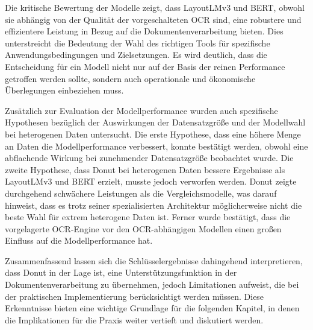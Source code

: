 Die kritische Bewertung der Modelle zeigt, dass LayoutLMv3 und BERT, obwohl sie abhängig von der Qualität der vorgeschalteten OCR sind, eine robustere und effizientere Leistung in Bezug auf die Dokumentenverarbeitung bieten. Dies unterstreicht die Bedeutung der Wahl des richtigen Tools für spezifische Anwendungsbedingungen und Zielsetzungen. Es wird deutlich, dass die Entscheidung für ein Modell nicht nur auf der Basis der reinen Performance getroffen werden sollte, sondern auch operationale und ökonomische Überlegungen einbeziehen muss.

Zusätzlich zur Evaluation der Modellperformance wurden auch spezifische Hypothesen bezüglich der Auswirkungen der Datensatzgröße und der Modellwahl bei heterogenen Daten untersucht. Die erste Hypothese, dass eine höhere Menge an Daten die Modellperformance verbessert, konnte bestätigt werden, obwohl eine abflachende Wirkung bei zunehmender Datensatzgröße beobachtet wurde. Die zweite Hypothese, dass Donut bei heterogenen Daten bessere Ergebnisse als LayoutLMv3 und BERT erzielt, musste jedoch verworfen werden. Donut zeigte durchgehend schwächere Leistungen als die Vergleichsmodelle, was darauf hinweist, dass es trotz seiner spezialisierten Architektur möglicherweise nicht die beste Wahl für extrem heterogene Daten ist. Ferner wurde bestätigt, dass die vorgelagerte OCR-Engine vor den OCR-abhängigen Modellen einen großen Einfluss auf die Modellperformance hat.

Zusammenfassend lassen sich die Schlüsselergebnisse dahingehend interpretieren, dass Donut in der Lage ist, eine Unterstützungsfunktion in der Dokumentenverarbeitung zu übernehmen, jedoch Limitationen aufweist, die bei der praktischen Implementierung berücksichtigt werden müssen. Diese Erkenntnisse bieten eine wichtige Grundlage für die folgenden Kapitel, in denen die Implikationen für die Praxis weiter vertieft und diskutiert werden.